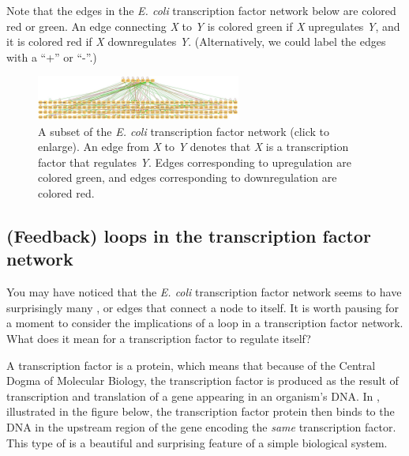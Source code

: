 Note that the edges in the \textit{E. coli} transcription factor network below are colored red or green. An edge connecting \textit{X} to \textit{Y} is colored green if \textit{X} upregulates \textit{Y}, and it is colored red if \textit{X} downregulates \textit{Y}. (Alternatively, we could label the edges with a ``+'' or ``-''.)

\begin{figure}[h]
\centering
\mySfFamily
\includegraphics[width = 0.6\textwidth]{../images/e_coli_tf_network.jpeg}
\caption{A subset of the \textit{E. coli} transcription factor network (click to enlarge). An edge from \textit{X} to \textit{Y} denotes that \textit{X} is a transcription factor that regulates \textit{Y}. Edges corresponding to upregulation are colored green, and edges corresponding to downregulation are colored red.}
\label{fig:e_coli_tf_network}
\end{figure}

\begin{qbox}\end{qbox} 

\FloatBarrier
{}
\subsection{(Feedback) loops in the transcription factor network}

You may have noticed that the \textit{E. coli} transcription factor network seems to have surprisingly many , or edges that connect a node to itself. It is worth pausing for a moment to consider the implications of a loop in a transcription factor network. What does it mean for a transcription factor to regulate itself?

A transcription factor is a protein, which means that because of the Central Dogma of Molecular Biology, the transcription factor is produced as the result of transcription and translation of a gene appearing in an organism's DNA. In , illustrated in the figure below, the transcription factor protein then binds to the DNA in the upstream region of the gene encoding the \textit{same} transcription factor. This type of  is a beautiful and surprising feature of a simple biological system.

